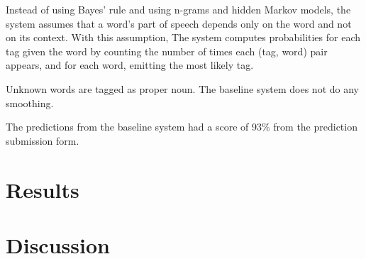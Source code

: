 \documentclass{article}
\begin{document}
Instead of using Bayes' rule and using n-grams and hidden Markov models,
the system assumes that a word's part of speech depends only
on the word and not on its context. With this assumption,
The system computes probabilities for each tag given the word by counting the
number of times each (tag, word) pair appears, and for each word, emitting the
most likely tag.

Unknown words are tagged as proper noun.
The baseline system does not do any smoothing.

The predictions from the baseline system had a score of 93\%
from the prediction submission form.

\section{Results}


\section{Discussion}
\end{document}
